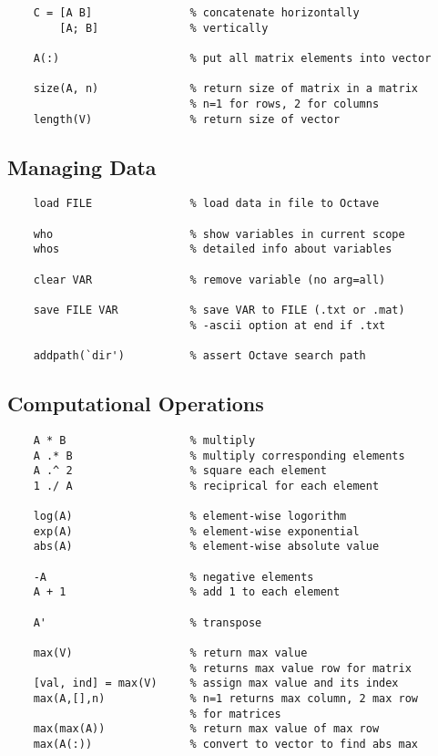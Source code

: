 \documentclass[12pt] {article}
\begin{document}
{\begin{lstlisting}
    C = [A B]               % concatenate horizontally
        [A; B]              % vertically

    A(:)                    % put all matrix elements into vector

    size(A, n)              % return size of matrix in a matrix
                            % n=1 for rows, 2 for columns
    length(V)               % return size of vector
    \end{lstlisting}

  \subsection{Managing Data}

    \begin{lstlisting}
    load FILE               % load data in file to Octave

    who                     % show variables in current scope
    whos                    % detailed info about variables
    
    clear VAR               % remove variable (no arg=all)

    save FILE VAR           % save VAR to FILE (.txt or .mat)
                            % -ascii option at end if .txt

    addpath(`dir')          % assert Octave search path
    \end{lstlisting}
    \vspace{1em}

  \subsection{Computational Operations}

    \begin{lstlisting}
    A * B                   % multiply 
    A .* B                  % multiply corresponding elements
    A .^ 2                  % square each element
    1 ./ A                  % reciprical for each element

    log(A)                  % element-wise logorithm
    exp(A)                  % element-wise exponential 
    abs(A)                  % element-wise absolute value

    -A                      % negative elements
    A + 1                   % add 1 to each element

    A'                      % transpose

    max(V)                  % return max value
                            % returns max value row for matrix
    [val, ind] = max(V)     % assign max value and its index
    max(A,[],n)             % n=1 returns max column, 2 max row
                            % for matrices
    max(max(A))             % return max value of max row
    max(A(:))               % convert to vector to find abs max


\end{lstlisting}}
\end{document}
